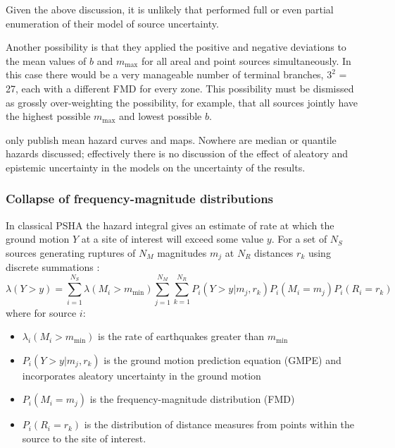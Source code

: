 \documentclass{article}
\begin{document}
Given the above discussion, it is unlikely that \cite{nath2012probabilistic} performed full or even partial enumeration of their model of source uncertainty.

Another possibility is that they applied the positive and negative deviations to the mean values of $b$ and $m_\text{max}$ for all areal and point sources simultaneously.
In this case there would be a very manageable number of terminal branches, $3^2$ = 27, each with a different FMD for every zone. 
This possibility must be dismissed as grossly over-weighting the possibility, for example, that all sources jointly have the highest possible $m_\text{max}$ and lowest possible $b$.

\cite{nath2012probabilistic} only publish mean hazard curves and maps.
Nowhere are median or quantile hazards discussed; effectively there is no discussion of the effect of aleatory and epistemic uncertainty in the models on the uncertainty of the results.

\subsubsection{Collapse of frequency-magnitude distributions}
\label{subsubsec:Collapse}

In classical PSHA the hazard integral gives an estimate of rate at which the ground motion $Y$ at a site of interest will exceed some value $y$. For a set of $N_S$ sources generating ruptures of $N_M$ magnitudes $m_j$ at $N_R$ distances $r_k$ using discrete summations \citep{baker2008introduction}:
\begin{equation} \label{eq:HazardRateSummation} 
\lambda(Y > y) = 
\sum_{i=1}^{N_S} 
\lambda(M_i > m_\text{min}) 
\sum_{j=1}^{N_M} 
\sum_{k=1}^{N_R} 
P_i(Y > y|m_j,r_k) 
P_i(M_i=m_j) 
P_i(R_i=r_k)
\end{equation}
where for source $i$:
\begin{itemize}
\item $\lambda_i(M_i > m_\text{min})$ is the rate of earthquakes greater than $m_\text{min}$
\item $P_i(Y > y|m_j,r_k)$ is the ground motion prediction equation (GMPE) and incorporates aleatory uncertainty in the ground motion
\item $P_i(M_i=m_j)$ is the frequency-magnitude distribution (FMD)
\item $P_i(R_i=r_k)$ is the distribution of distance measures from points within the source to the site of interest.
\end{itemize}
\end{document}
